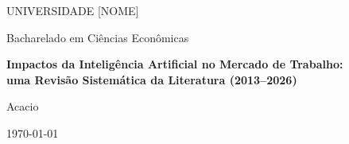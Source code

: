 
\begin{titlepage}
\centering
{\Large UNIVERSIDADE [NOME]\par}
\vspace{1cm}
{\large Bacharelado em Ciências Econômicas\par}
\vspace{4cm}
{\LARGE\bfseries Impactos da Inteligência Artificial no Mercado de Trabalho:\\
uma Revisão Sistemática da Literatura (2013--2026)\par}
\vspace{2cm}
{\large Acacio\par}
\vfill
{\large \today\par}
\end{titlepage}
\newpage
